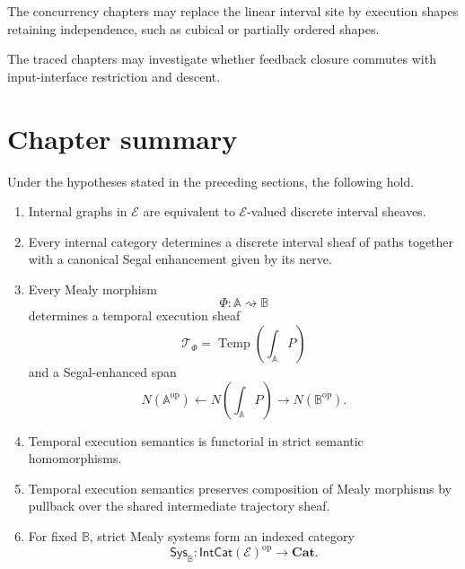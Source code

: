 The concurrency chapters may replace the linear interval site by execution
shapes retaining independence, such as cubical or partially ordered shapes.

The traced chapters may investigate whether feedback closure commutes with
input-interface restriction and descent.

\section{Chapter summary}
\label{sec:temporal-interface-chapter-summary}

\begin{theorem}
\label{thm:temporal-trajectories-interface-descent-summary}
Under the hypotheses stated in the preceding sections, the following hold.

\begin{enumerate}
    \item Internal graphs in \(\mathcal E\) are equivalent to
    \(\mathcal E\)-valued discrete interval sheaves.

    \item Every internal category determines a discrete interval sheaf of
    paths together with a canonical Segal enhancement given by its nerve.

    \item Every Mealy morphism
    \[
        \Phi:\mathbb A\rightsquigarrow\mathbb B
    \]
    determines a temporal execution sheaf
    \[
        \mathscr T_\Phi
        =
        \operatorname{Temp}
        \left(
        \int_{\mathbb A}P
        \right)
    \]
    and a Segal-enhanced span
    \[
        N(\mathbb A^{\mathrm{op}})
        \longleftarrow
        N\left(\int_{\mathbb A}P\right)
        \longrightarrow
        N(\mathbb B^{\mathrm{op}}).
    \]

    \item Temporal execution semantics is functorial in strict semantic
    homomorphisms.

    \item Temporal execution semantics preserves composition of Mealy
    morphisms by pullback over the shared intermediate trajectory sheaf.

    \item For fixed \(\mathbb B\), strict Mealy systems form an indexed
    category
    \[
        \mathsf{Sys}_{\mathbb B}:
        \mathsf{IntCat}(\mathcal E)^{\mathrm{op}}
        \to
        \mathbf{Cat}.
    \]


\end{enumerate}
\end{theorem}
